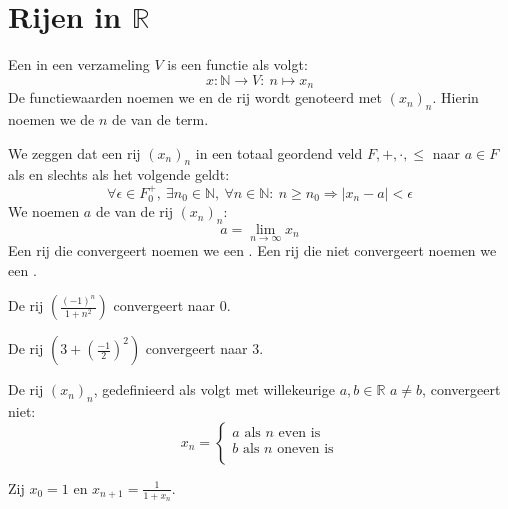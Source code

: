 \documentclass[main.tex]{subfiles}
\begin{document}
\section{Rijen in $\mathbb{R}$}
\label{sec:rijen-mathbbr}

\begin{de}
  Een  in een verzameling $V$ is een functie als volgt:
  \[ x: \mathbb{N} \rightarrow V:\ n\mapsto x_{n} \]
  De functiewaarden noemen we  en de rij wordt genoteerd met $(x_{n})_{n}$.
  Hierin noemen we de $n$ de  van de term.
\end{de}

\begin{de}
  We zeggen dat een rij $(x_{n})_{n}$ in een totaal geordend veld $F,+,\cdot,\le$  naar $a\in F$ als en slechts als het volgende geldt:
  \[ \forall \epsilon \in F_{0}^{+},\ \exists n_{0}\in \mathbb{N},\ \forall n\in \mathbb{N}:\ n \ge n_{0} \Rightarrow |x_{n}-a| < \epsilon \]
  We noemen $a$ de  van de rij $(x_{n})_{n}$:
  \[ a = \lim_{n\rightarrow \infty}x_{n} \]
  Een rij die convergeert noemen we een .
  Een rij die niet convergeert noemen we een .
\end{de}

\begin{vb}
  De rij $\left(\frac{(-1)^{n}}{1+n^{2}}\right)$ convergeert naar $0$.
\end{vb}

\begin{vb}
  De rij $\left( 3 + \left(\frac{-1}{2
}\right)^{2}\right)$ convergeert naar $3$.
\end{vb}

\begin{vb}
  De rij $(x_{n})_{n}$, gedefinieerd als volgt met willekeurige $a,b\in \mathbb{R}$ $a\neq b$, convergeert niet:
  \[
  x_{n} = 
  \begin{cases}
    a \text{ als } n \text{ even is}\\
    b \text{ als } n \text{ oneven is}\\
  \end{cases}
  \]
\end{vb}

\begin{vb}
  Zij $x_{0}=1$ en $x_{n+1} = \frac{1}{1+x_{n}}$.
\end{vb}
\end{document}
